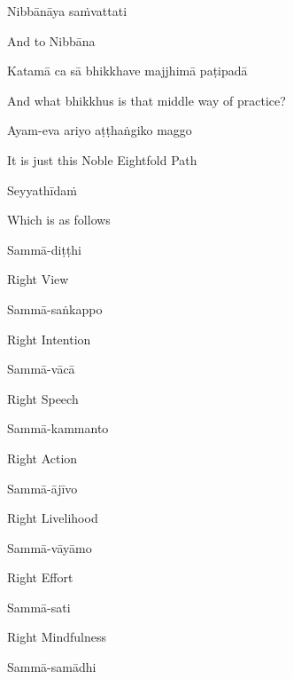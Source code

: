 Nibbānāya saṁvattati

\begin{cprenglish}
And to Nibbāna
\end{cprenglish}

Katamā ca sā bhikkhave majjhimā paṭipadā

\begin{cprenglish}
And what bhikkhus is that middle way of practice?
\end{cprenglish}

Ayam-eva ariyo aṭṭhaṅgiko maggo

\begin{cprenglish}
It is just this Noble Eightfold Path
\end{cprenglish}

Seyyathīdaṁ

\begin{cprenglish}
Which is as follows
\end{cprenglish}

Sammā-diṭṭhi

\begin{cprenglish}
Right View
\end{cprenglish}

Sammā-saṅkappo

\begin{cprenglish}
Right Intention
\end{cprenglish}

Sammā-vācā

\begin{cprenglish}
Right Speech
\end{cprenglish}

Sammā-kammanto

\begin{cprenglish}
Right Action
\end{cprenglish}

Sammā-ājīvo

\begin{cprenglish}
Right Livelihood
\end{cprenglish}

Sammā-vāyāmo

\begin{cprenglish}
Right Effort
\end{cprenglish}

Sammā-sati

\begin{cprenglish}
Right Mindfulness
\end{cprenglish}

Sammā-samādhi

